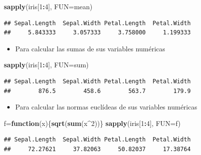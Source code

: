 \documentclass[]{book}
\newenvironment{Shaded}{\begin{snugshade}}{\end{snugshade}}
\newcommand{\ControlFlowTok}[1]{\textcolor[rgb]{0.13,0.29,0.53}{\textbf{#1}}}
\newcommand{\DataTypeTok}[1]{\textcolor[rgb]{0.13,0.29,0.53}{#1}}
\newcommand{\DecValTok}[1]{\textcolor[rgb]{0.00,0.00,0.81}{#1}}
\newcommand{\KeywordTok}[1]{\textcolor[rgb]{0.13,0.29,0.53}{\textbf{#1}}}
\newcommand{\NormalTok}[1]{#1}
\newcommand{\OperatorTok}[1]{\textcolor[rgb]{0.81,0.36,0.00}{\textbf{#1}}}
\providecommand{\tightlist}{%
  \setlength{\itemsep}{0pt}\setlength{\parskip}{0pt}}
\theoremstyle{definition}
\theoremstyle{definition}
\theoremstyle{definition}
\theoremstyle{remark}
\begin{document}
\begin{Shaded}
\begin{Highlighting}[]
\KeywordTok{sapply}\NormalTok{(iris[}\DecValTok{1}\OperatorTok{:}\DecValTok{4}\NormalTok{], }\DataTypeTok{FUN=}\NormalTok{mean)}
\end{Highlighting}
\end{Shaded}

\begin{verbatim}
## Sepal.Length  Sepal.Width Petal.Length  Petal.Width 
##     5.843333     3.057333     3.758000     1.199333
\end{verbatim}

\begin{itemize}
\tightlist
\item
  Para calcular las sumas de sus variables numéricas
\end{itemize}

\begin{Shaded}
\begin{Highlighting}[]
\KeywordTok{sapply}\NormalTok{(iris[}\DecValTok{1}\OperatorTok{:}\DecValTok{4}\NormalTok{], }\DataTypeTok{FUN=}\NormalTok{sum) }
\end{Highlighting}
\end{Shaded}

\begin{verbatim}
## Sepal.Length  Sepal.Width Petal.Length  Petal.Width 
##        876.5        458.6        563.7        179.9
\end{verbatim}

\begin{itemize}
\tightlist
\item
  Para calcular las normas euclídeas de sus variables numéricas
\end{itemize}

\begin{Shaded}
\begin{Highlighting}[]
\NormalTok{f=}\ControlFlowTok{function}\NormalTok{(x)\{}\KeywordTok{sqrt}\NormalTok{(}\KeywordTok{sum}\NormalTok{(x}\OperatorTok{^}\DecValTok{2}\NormalTok{))\} }
\KeywordTok{sapply}\NormalTok{(iris[}\DecValTok{1}\OperatorTok{:}\DecValTok{4}\NormalTok{], }\DataTypeTok{FUN=}\NormalTok{f) }
\end{Highlighting}
\end{Shaded}

\begin{verbatim}
## Sepal.Length  Sepal.Width Petal.Length  Petal.Width 
##     72.27621     37.82063     50.82037     17.38764
\end{verbatim}
\end{document}
